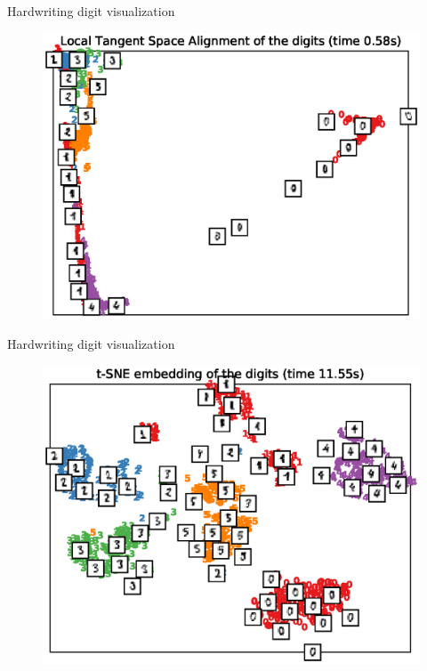 \documentclass[10pt]{beamer}
\begin{document}
\begin{frame}{Hardwriting digit visualization}
\begin{figure}
\centering
\includegraphics[scale=0.65]{./image/experiment/ltsa.eps}
\end{figure}
\end{frame}

\begin{frame}{Hardwriting digit visualization}
\begin{figure}
\centering
\includegraphics[scale=0.65]{./image/experiment/tsne.eps}
\end{figure}
\end{frame}
\end{document}

